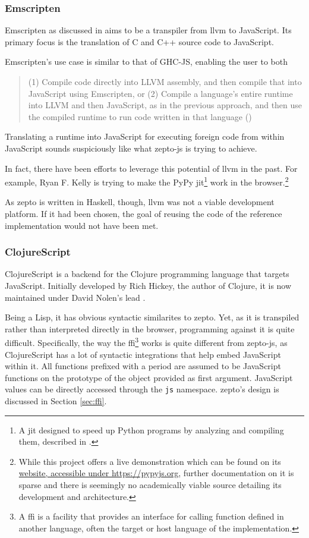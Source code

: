 \documentclass[oneside,11pt,xetex]{scrbook}
\begin{document}
\subsubsection{Emscripten}

Emscripten as discussed in \parencite{ZAKA} aims to be a transpiler from \gls{llvm} to
JavaScript. Its primary focus is the translation of C and C++ source code
to JavaScript.

Emscripten's use case is similar to that of GHC-JS, enabling the user to both \blockquote{(1)
Compile code directly into LLVM assembly, and then compile that into JavaScript
using Emscripten, or (2) Compile a language’s entire runtime into LLVM and then
JavaScript, as in the previous approach, and then use the compiled runtime to
run code written in that language (\cite{ZAKA})}. Translating a runtime into
JavaScript for executing foreign code from within JavaScript sounds
suspiciously like what zepto-js is trying to achieve.

In fact, there have been efforts to leverage this potential of \gls{llvm} in
the past. For example, Ryan F. Kelly is trying to make the PyPy \gls{jit}\footnote{A \gls{jit}
designed to speed up Python programs by analyzing and compiling them, described
in \parencite{PYPY}.} work in the browser.\footnote{While this project offers
a live demonstration which can be found on its \href{https://pypyjs.org}{website, accessible
under https://pypyjs.org}, further documentation on it is sparse and there is seemingly
no academically viable source detailing its development and architecture.}

As zepto is written in Haskell, though, \gls{llvm} was not a viable development
platform. If it had been chosen, the goal of reusing the code of the reference
implementation would not have been met.

\subsubsection{ClojureScript}
\label{sec:ClojureScript}

ClojureScript is a backend for the Clojure programming language that targets
JavaScript. Initially developed by Rich Hickey, the author of Clojure, it is
now maintained under David Nolen's lead \parencite{CLJS}.

Being a Lisp, it has obvious syntactic similarites to zepto. Yet, as it is
transpiled rather than interpreted directly in the browser, programming against
it is quite difficult. Specifically, the way the \gls{ffi}\footnote{A \gls{ffi}
is a facility that provides an interface for calling function defined in another
language, often the target or host language of the implementation.} works is quite
different from zepto-js, as ClojureScript has a lot of syntactic integrations
that help embed JavaScript within it. All functions prefixed with a period are
assumed to be JavaScript functions on the prototype of the object provided as
first argument. JavaScript values can be directly accessed through the \texttt{js}
namespace. zepto's design is discussed in Section \ref{sec:ffi}.
\end{document}
